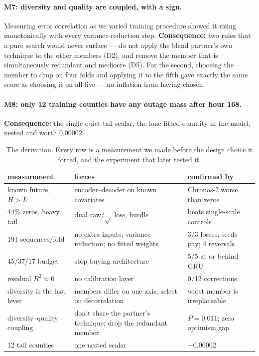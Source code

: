 \documentclass[10pt,letterpaper,twocolumn]{article}
\begin{document}
\paragraph{M7: diversity and quality are coupled, with a sign.} Measuring error
correlation as we varied training procedure showed it rising monotonically with
every variance-reduction step. \textbf{Consequence:} two rules that a pure
search would never surface --- do not apply the blend partner's own technique to
the other members (D2), and remove the member that is simultaneously redundant
and mediocre (D5). For the second, choosing the member to drop on four folds
and applying it to the fifth gave exactly the same score as choosing it on all
five --- no inflation from having chosen.

\paragraph{M8: only 12 training counties have any outage mass after hour 168.}
\textbf{Consequence:} the single quiet-tail scalar, the lone fitted quantity in
the model, nested and worth $0.00002$.

\begin{table}[t]\small\centering
\begin{tabular}{@{}p{2.35cm}p{2.55cm}p{2.35cm}@{}}
\toprule
measurement & forces & confirmed by \\
\midrule
known future, $H>L$ & encoder--decoder on known covariates & Chronos-2 worse than zeros \\
44\% zeros, heavy tail & dual raw$/\sqrt{}$ loss, hurdle & beats single-scale controls \\
191 sequences/fold & no extra inputs; variance reduction; no fitted weights & 3/3 losses; seeds pay; 4 reversals \\
45/37/17 budget & stop buying architecture & 5/5 at or behind GRU \\
residual $R^2\!\approx\!0$ & no calibration layer & 0/12 corrections \\
diversity is the last lever & members differ on one axis; select on decorrelation & worst member is irreplaceable \\
diversity--quality coupling & don't share the partner's technique; drop the redundant member & $P{=}0.011$; zero optimism gap \\
12 tail counties & one nested scalar & $-0.00002$ \\
\bottomrule
\end{tabular}
\caption{The derivation. Every row is a measurement we made before the design
choice it forced, and the experiment that later tested it.}
\label{tab:deriv}
\end{table}
\end{document}
